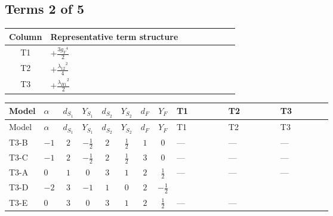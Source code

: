 \documentclass[8pt]{article}
\begin{document}
\begin{landscape}
\subsection*{Terms 2 of 5}
\begin{center}
\begin{tabular}{@{}c >{\raggedright\arraybackslash}p{0.82\linewidth}@{}}
\toprule
Column & Representative term structure \\
\midrule
T1 & \(\displaystyle +\frac{3 {g_Y}^4}{2}\) \\
\midrule
T2 & \(\displaystyle +\frac{{\lambda_{12}}^2}{4}\) \\
\midrule
T3 & \(\displaystyle +\frac{{\lambda_{H1}}^2}{2}\) \\
\midrule
\bottomrule
\end{tabular}
\end{center}
\smallskip
\tiny
\begin{longtable}{@{}llcccccc >{\raggedright\arraybackslash}p{0.21\linewidth} >{\raggedright\arraybackslash}p{0.21\linewidth} >{\raggedright\arraybackslash}p{0.21\linewidth}@{}}
\toprule
Model & $\alpha$ & $d_{S_1}$ & $Y_{S_1}$ & $d_{S_2}$ & $Y_{S_2}$ & $d_F$ & $Y_F$ & T1 & T2 & T3 \\
\midrule
\endfirsthead
\toprule
Model & $\alpha$ & $d_{S_1}$ & $Y_{S_1}$ & $d_{S_2}$ & $Y_{S_2}$ & $d_F$ & $Y_F$ & T1 & T2 & T3 \\
\midrule
\endhead
T3-B & $-1$ & $2$ & $-\frac{1}{2}$ & $2$ & $\frac{1}{2}$ & $1$ & $0$ & --- & --- & --- \\
\midrule
T3-C & $-1$ & $2$ & $-\frac{1}{2}$ & $2$ & $\frac{1}{2}$ & $3$ & $0$ & --- & --- & --- \\
\midrule
T3-A & $0$ & $1$ & $0$ & $3$ & $1$ & $2$ & $\frac{1}{2}$ & --- & --- & --- \\
\midrule
T3-D & $-2$ & $3$ & $-1$ & $1$ & $0$ & $2$ & $-\frac{1}{2}$ & \scriptsize\adjustbox{max width=\linewidth}{$\begin{gathered} +\frac{3 {g_Y}^4}{2}\end{gathered}$} & \scriptsize\adjustbox{max width=\linewidth}{$\begin{gathered} +\frac{{\lambda_{12}}^2}{4}\end{gathered}$} & \scriptsize\adjustbox{max width=\linewidth}{$\begin{gathered} +\frac{{\lambda_{H1}}^2}{2}\end{gathered}$} \\
\midrule
T3-E & $0$ & $3$ & $0$ & $3$ & $1$ & $2$ & $\frac{1}{2}$ & --- & --- & \scriptsize\adjustbox{max width=\linewidth}{$\begin{gathered} +\frac{{\lambda_{H1}}^2}{2}\end{gathered}$} \\
\midrule
\bottomrule
\end{longtable}
\clearpage

\end{landscape}
\end{document}

